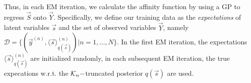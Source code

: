 Thus, in each EM iteration, we calculate the affinity function by using a GP to regress $\vec{S}$ onto $\vec{Y}$.  
Specifically, we define our training data as the \textit{expectations} of latent variables $\vec{s}$ 
and the set of observed variables $\vec{Y}$, namely 
$\mathcal{D} = \{ (\vec{y}^{(n)}, \langle\vec{s}\rangle^{(n)}_{q(\vec{s})}) | n = 1,\dots, N \}$.
%
In the first EM iteration, the expectations $\langle\vec{s}\rangle^{(n)}_{q(\vec{s})}$ are initialized randomly, 
in each subsequent EM iteration, the true expecations w.r.t. the $\mathcal{K}_{n}-$truncated posterior $q(\vec{s})$ are used. 

